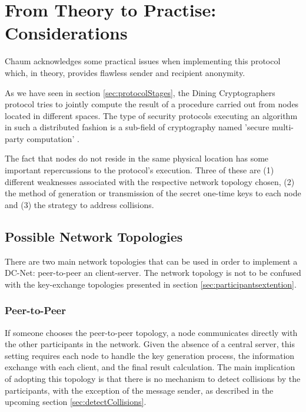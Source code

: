 \section{From Theory to Practise: Considerations}
Chaum acknowledges some practical issues when implementing this protocol which, in theory, provides flawless sender and recipient anonymity.

As we have seen in section \ref{sec:protocolStages}, the Dining Cryptographers protocol tries to jointly compute the result of a procedure carried out from nodes located in different spaces. The type of security protocols executing an algorithm in such a distributed fashion is a sub-field of cryptography named 'secure multi-party computation' \cite{wiki1}.

The fact that nodes do not reside in the same physical location has some important repercussions to the protocol's execution. Three of these are (1) different weaknesses associated with the respective network topology chosen, (2) the method of generation or transmission of the secret one-time keys to each node and (3) the strategy to address collisions.

\subsection{Possible Network Topologies} \label{sec:networkTopologies}
There are two main network topologies that can be used in order to implement a DC-Net: peer-to-peer an client-server. The network topology is not to be confused with the key-exchange topologies presented in section \ref{sec:participantsextention}.


\subsubsection{Peer-to-Peer} \label{sec:peertopeer}
If someone chooses the peer-to-peer topology, a node communicates directly with the other participants in the network. Given the absence of a central server, this setting requires each node to handle the key generation process, the information exchange with each client, and the final result calculation.
The main implication of adopting this topology is that there is no mechanism to detect collisions by the participants, with the exception of the message sender, as described in the upcoming section \ref{sec:detectCollisions}. 



